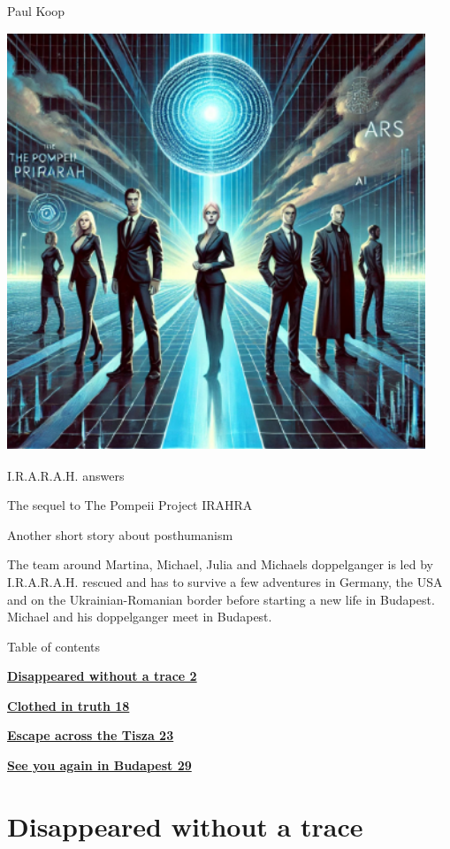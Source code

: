 \documentclass[
]{article}
\author{}
\date{}
\begin{document}
Paul Koop

\includegraphics[width=4.92849in,height=4.92031in]{media/image001.png}

I.R.A.R.A.H. answers

The sequel to The Pompeii Project IRAHRA

Another short story about posthumanism

The team around Martina, Michael, Julia and Michael\textquotesingle s
doppelganger is led by I.R.A.R.A.H. rescued and has to survive a few
adventures in Germany, the USA and on the Ukrainian-Romanian border
before starting a new life in Budapest. Michael and his doppelganger
meet in Budapest.

Table of contents

\hyperref[disappeared-without-a-trace]{\textbf{Disappeared without a
trace 2}}

\hyperref[clothed-in-truth]{\textbf{Clothed in truth 18}}

\hyperref[escape-across-the-tisza]{\textbf{Escape across the Tisza 23}}

\hyperref[see-you-again-in-budapest]{\textbf{See you again in Budapest
29}}

\section{Disappeared without a trace}\label{disappeared-without-a-trace}
\end{document}
